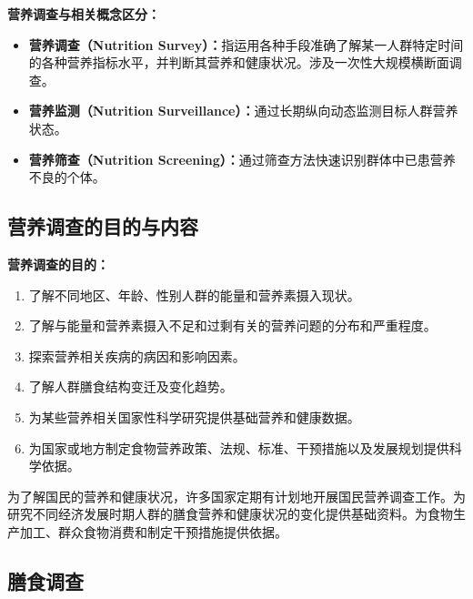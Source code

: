 \begin{defbox}
\textbf{营养调查与相关概念区分：}
\begin{itemize}[leftmargin=*]
    \item \textbf{营养调查（Nutrition Survey）：}指运用各种手段准确了解某一人群特定时间的各种营养指标水平，并判断其营养和健康状况。涉及一次性大规模横断面调查。
    \item \textbf{营养监测（Nutrition Surveillance）：}通过长期纵向动态监测目标人群营养状态。
    \item \textbf{营养筛查（Nutrition Screening）：}通过筛查方法快速识别群体中已患营养不良的个体。
\end{itemize}
\end{defbox}

\subsection{营养调查的目的与内容}

\begin{keybox}
\textbf{营养调查的目的：}
\begin{enumerate}[leftmargin=*]
    \item 了解不同地区、年龄、性别人群的能量和营养素摄入现状。
    \item 了解与能量和营养素摄入不足和过剩有关的营养问题的分布和严重程度。
    \item 探索营养相关疾病的病因和影响因素。
    \item 了解人群膳食结构变迁及变化趋势。
    \item 为某些营养相关国家性科学研究提供基础营养和健康数据。
    \item 为国家或地方制定食物营养政策、法规、标准、干预措施以及发展规划提供科学依据。
\end{enumerate}
\end{keybox}

为了解国民的营养和健康状况，许多国家定期有计划地开展国民营养调查工作。为研究不同经济发展时期人群的膳食营养和健康状况的变化提供基础资料。为食物生产加工、群众食物消费和制定干预措施提供依据。

\subsection{膳食调查}

